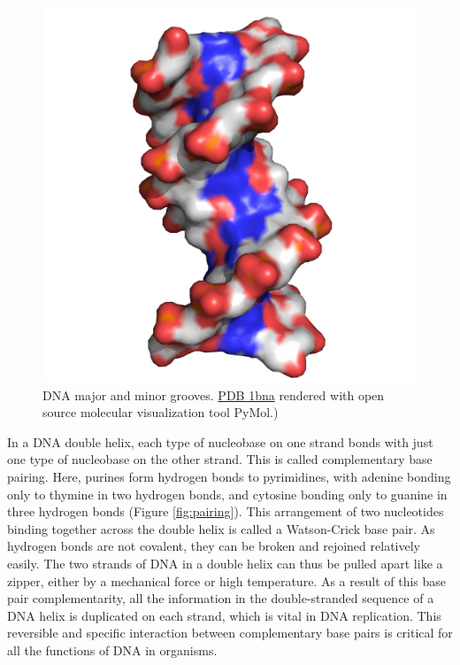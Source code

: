 \begin{figure}

{\centering \includegraphics[width=0.7\linewidth]{./figures/dna/dna_solid} 

}

\caption{DNA major and minor grooves. \href{https://www.rcsb.org/structure/1bna}{PDB 1bna} rendered with open source molecular visualization tool PyMol.)}\label{fig:groove}
\end{figure}

In a DNA double helix, each type of nucleobase on one strand bonds with just one type of nucleobase on the other strand. This is called complementary base pairing. Here, purines form hydrogen bonds to pyrimidines, with adenine bonding only to thymine in two hydrogen bonds, and cytosine bonding only to guanine in three hydrogen bonds (Figure \ref{fig:pairing}). This arrangement of two nucleotides binding together across the double helix is called a Watson-Crick base pair. As hydrogen bonds are not covalent, they can be broken and rejoined relatively easily. The two strands of DNA in a double helix can thus be pulled apart like a zipper, either by a mechanical force or high temperature. As a result of this base pair complementarity, all the information in the double-stranded sequence of a DNA helix is duplicated on each strand, which is vital in DNA replication. This reversible and specific interaction between complementary base pairs is critical for all the functions of DNA in organisms.



